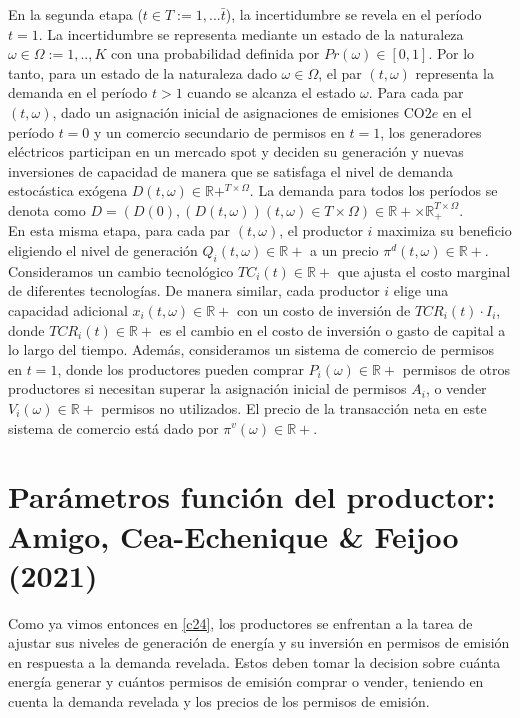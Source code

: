 En la segunda etapa ($t\in T:={1,...\bar{t}}$), la incertidumbre se revela en el período $t=1$. La incertidumbre se representa mediante un estado de la naturaleza $\omega\in\Omega:={1,..,K}$ con una probabilidad definida por $Pr(\omega)\in[0,1]$. Por lo tanto, para un estado de la naturaleza dado $\omega\in\Omega$, el par $(t,\omega)$ representa la demanda en el período $t>1$ cuando se alcanza el estado $\omega$. Para cada par $(t,\omega)$, dado un asignación inicial de asignaciones de emisiones CO$2e$ en el período $t=0$ y un comercio secundario de permisos en $t=1$, los generadores eléctricos participan en un mercado spot y deciden su generación y nuevas inversiones de capacidad de manera que se satisfaga el nivel de demanda estocástica exógena $D(t,\omega)\in\mathbb{R}+^{T\times\Omega}$. La demanda para todos los períodos se denota como $D=\left(D(0),(D(t,\omega)){(t,\omega)\in T\times\Omega}\right)\in\mathbb{R}+\times\mathbb{R}_+^{T\times\Omega}$.\\

En esta misma etapa, para cada par $(t,\omega)$, el productor $i$ maximiza su beneficio eligiendo el nivel de generación $Q_i(t,\omega)\in\mathbb{R}+$ a un precio $\pi^d(t,\omega)\in\mathbb{R}+$. Consideramos un cambio tecnológico $TC_i(t) \in\mathbb{R}+$ que ajusta el costo marginal de diferentes tecnologías. De manera similar, cada productor $i$ elige una capacidad adicional $x_i(t,\omega)\in\mathbb{R}+$ con un costo de inversión de $TCR_i(t)\cdot I_i$, donde $TCR_i(t)\in\mathbb{R}+$ es el cambio en el costo de inversión o gasto de capital a lo largo del tiempo. Además, consideramos un sistema de comercio de permisos en $t=1$, donde los productores pueden comprar $P_i(\omega)\in\mathbb{R}+$ permisos de otros productores si necesitan superar la asignación inicial de permisos $A_i$, o vender $V_i(\omega)\in\mathbb{R}+$ permisos no utilizados. El precio de la transacción neta en este sistema de comercio está dado por $\pi^v(\omega)\in\mathbb{R}+$.\\


\section{Parámetros función del productor: Amigo, Cea-Echenique \& Feijoo (2021)}\label{c25}

Como ya vimos entonces en \ref{c24}, 
 los productores se enfrentan a la tarea de ajustar sus niveles de generación de energía y su inversión en permisos de emisión en respuesta a la demanda revelada. Estos deben tomar la decision sobre cuánta energía generar y cuántos permisos de emisión comprar o vender, teniendo en cuenta la demanda revelada y los precios de los permisos de emisión.\\

